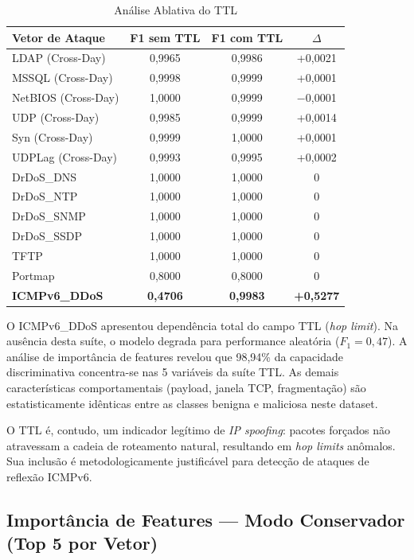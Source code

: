 \documentclass[12pt,a4paper]{article}
\begin{document}
\begin{center}
\footnotesize
\begin{longtable}{l c c c}
\caption{An\'{a}lise Ablativa do TTL} \label{tab:ablative} \\
\toprule
Vetor de Ataque & F1 sem TTL & F1 com TTL & $\Delta$ \\
\midrule
LDAP (Cross-Day) & 0,9965 & 0,9986 & +0,0021 \\
MSSQL (Cross-Day) & 0,9998 & 0,9999 & +0,0001 \\
NetBIOS (Cross-Day) & 1,0000 & 0,9999 & $-$0,0001 \\
UDP (Cross-Day) & 0,9985 & 0,9999 & +0,0014 \\
Syn (Cross-Day) & 0,9999 & 1,0000 & +0,0001 \\
UDPLag (Cross-Day) & 0,9993 & 0,9995 & +0,0002 \\
\midrule
DrDoS\_DNS & 1,0000 & 1,0000 & 0 \\
DrDoS\_NTP & 1,0000 & 1,0000 & 0 \\
DrDoS\_SNMP & 1,0000 & 1,0000 & 0 \\
DrDoS\_SSDP & 1,0000 & 1,0000 & 0 \\
TFTP & 1,0000 & 1,0000 & 0 \\
Portmap & 0,8000 & 0,8000 & 0 \\
\textbf{ICMPv6\_DDoS} & \textbf{0,4706} & \textbf{0,9983} & \textbf{+0,5277} \\
\bottomrule
\end{longtable}
\end{center}

O ICMPv6\_DDoS apresentou depend\^{e}ncia total do campo TTL (\textit{hop limit}). Na aus\^{e}ncia desta su\'{i}te, o modelo degrada para performance aleat\'{o}ria ($F_1 = 0{,}47$). A an\'{a}lise de import\^{a}ncia de features revelou que 98,94\% da capacidade discriminativa concentra-se nas 5 vari\'{a}veis da su\'{i}te TTL. As demais caracter\'{i}sticas comportamentais (payload, janela TCP, fragmenta\c{c}\~{a}o) s\~{a}o estatisticamente id\^{e}nticas entre as classes benigna e maliciosa neste dataset.

O TTL \'{e}, contudo, um indicador leg\'{i}timo de \textit{IP spoofing}: pacotes for\c{c}ados n\~{a}o atravessam a cadeia de roteamento natural, resultando em \textit{hop limits} an\^{o}malos. Sua inclus\~{a}o \'{e} metodologicamente justific\'{a}vel para detec\c{c}\~{a}o de ataques de reflex\~{a}o ICMPv6.

\subsection{Import\^{a}ncia de Features --- Modo Conservador (Top 5 por Vetor)}
\end{document}
